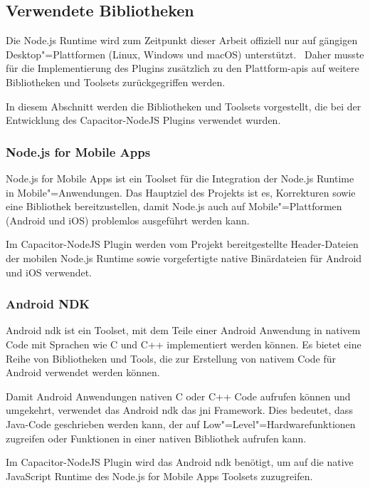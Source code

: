 \subsection{Verwendete Bibliotheken}

Die Node.js Runtime wird zum Zeitpunkt dieser Arbeit offiziell nur auf gängigen Desktop"=Plattformen (Linux, Windows und macOS) unterstützt.~\cite{nodejs}
Daher musste für die Implementierung des Plugins zusätzlich zu den Plattform-\acsp{api} auf weitere Bibliotheken und Toolsets zurückgegriffen werden.

In diesem Abschnitt werden die Bibliotheken und Toolsets vorgestellt, die bei der Entwicklung des Capacitor-NodeJS Plugins verwendet wurden.

\subsubsection{Node.js for Mobile Apps}

Node.js for Mobile Apps ist ein Toolset für die Integration der Node.js Runtime in Mobile"=Anwendungen.
Das Hauptziel des Projekts ist es, Korrekturen sowie eine Bibliothek bereitzustellen, damit Node.js auch auf Mobile"=Plattformen (Android und iOS) problemlos ausgeführt werden kann.
\cite{nodejs-mobile, nodejs-mobile:docs}

Im Capacitor-NodeJS Plugin werden vom Projekt bereitgestellte Header-Dateien der mobilen Node.js Runtime sowie vorgefertigte native Binärdateien für Android und iOS verwendet.

\subsubsection{Android NDK}

Android \ac{ndk} ist ein Toolset, mit dem Teile einer Android Anwendung in nativem Code mit Sprachen wie C und C++ implementiert werden können.
Es bietet eine Reihe von Bibliotheken und Tools, die zur Erstellung von nativem Code für Android verwendet werden können.
\cite{android:ndk}

Damit Android Anwendungen nativen C oder C++ Code aufrufen können und umgekehrt, verwendet das Android \ac{ndk} das \ac{jni} Framework.
Dies bedeutet, dass Java-Code geschrieben werden kann, der auf Low"=Level"=Hardwarefunktionen zugreifen oder Funktionen in einer nativen Bibliothek aufrufen kann.
\cite{android:ndk}

Im Capacitor-NodeJS Plugin wird das Android \ac{ndk} benötigt, um auf die native JavaScript Runtime des Node.js for Mobile Apps Toolsets zuzugreifen.
\cite{nodejs-mobile:docs}

